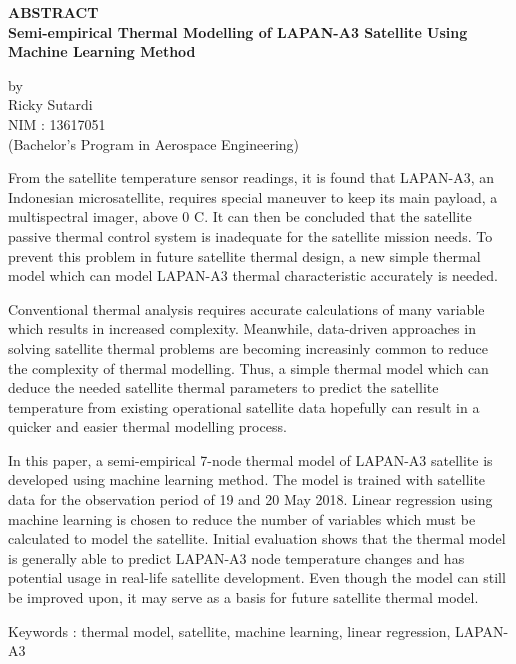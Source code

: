 \begin{center}
       \Large
       \textbf{ABSTRACT} \\
        \vspace{1.5cm}
        \large
        \textbf{Semi-empirical Thermal Modelling of LAPAN-A3 Satellite Using Machine Learning Method}\\
        
        \vspace{1.5cm}
        
        by\\
        Ricky Sutardi\\
        NIM : 13617051\\
        (Bachelor's Program in Aerospace Engineering)\\
        \vspace{1.5cm}
\end{center}

From the satellite temperature sensor readings, it is found that LAPAN-A3, an
Indonesian microsatellite, requires special maneuver to keep its main payload,
a multispectral imager, above 0 \degree C. It can then be concluded that the
satellite passive thermal control system is inadequate for the satellite
mission needs. To prevent this problem in future satellite thermal design, a
new simple thermal model which can model LAPAN-A3 thermal characteristic
accurately is needed.

Conventional thermal analysis requires accurate calculations of many variable
which results in increased complexity. Meanwhile, data-driven approaches in
solving satellite thermal problems are becoming increasinly common to reduce
the complexity of thermal modelling. Thus, a simple thermal model which can
deduce the needed satellite thermal parameters to predict the satellite
temperature from existing operational satellite data hopefully can result in a
quicker and easier thermal modelling process.

In this paper, a semi-empirical 7-node thermal model of LAPAN-A3 satellite is
developed using machine learning method. The model is trained with satellite
data for the observation period of 19 and 20 May 2018. Linear regression using
machine learning is chosen to reduce the number of variables which must be
calculated to model the satellite. Initial evaluation shows that the thermal
model is generally able to predict LAPAN-A3 node temperature changes and has
potential usage in real-life satellite development. Even though the model can
still be improved upon, it may serve as a basis for future satellite thermal
model.

\vspace{1.0cm}
\noindent 
Keywords : thermal model, satellite, machine learning, linear regression, LAPAN-A3 
